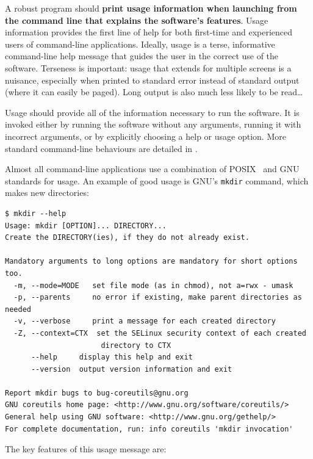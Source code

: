 \documentclass[10pt,letterpaper]{article}
\begin{document}
A robust program should
\textbf{print usage information when launching from the command line that explains the software's features}.
Usage information provides the first line of help for both first-time and
experienced users of command-line applications.
Ideally, usage is a terse, informative command-line help message that
guides the user in the correct use of the software. Terseness is
important: usage that extends for multiple screens is a nuisance, especially when
printed to standard error instead of standard output (where it can
easily be paged).  Long output is also much less likely to be read{\ldots}

Usage should provide all of the information necessary to run the
software. It is invoked either by running the software without
any arguments, running it with incorrect arguments, or by
explicitly choosing a help or usage option.
More standard command-line behaviours are detailed in \cite{Seemann2013}.

Almost all command-line applications use a combination of
POSIX~\cite{posix2016} and GNU~\cite{gnustandards} standards for usage. 
An example of good usage is GNU's \texttt{mkdir} command, which makes
new directories:

\begin{small}
\begin{verbatim}
$ mkdir --help
Usage: mkdir [OPTION]... DIRECTORY...
Create the DIRECTORY(ies), if they do not already exist.

Mandatory arguments to long options are mandatory for short options too.
  -m, --mode=MODE   set file mode (as in chmod), not a=rwx - umask
  -p, --parents     no error if existing, make parent directories as needed
  -v, --verbose     print a message for each created directory
  -Z, --context=CTX  set the SELinux security context of each created
                      directory to CTX
      --help     display this help and exit
      --version  output version information and exit

Report mkdir bugs to bug-coreutils@gnu.org
GNU coreutils home page: <http://www.gnu.org/software/coreutils/>
General help using GNU software: <http://www.gnu.org/gethelp/>
For complete documentation, run: info coreutils 'mkdir invocation'
\end{verbatim}
\end{small}

The key features of this usage message are:
\end{document}
